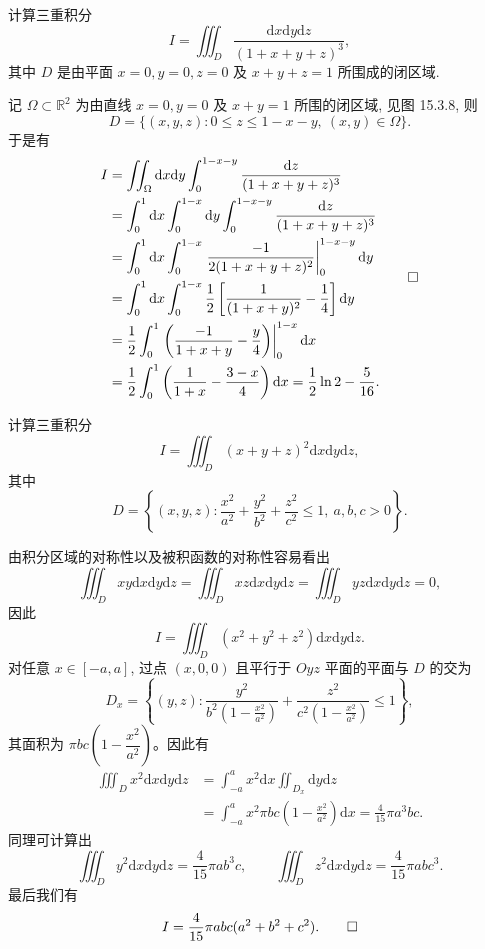 \begin{example}\label{example:ma-15-3-5}
计算三重积分
\[
  I=\iiint_D\frac{\mathrm dx\mathrm dy\mathrm dz}{(1+x+y+z)^3},
\]
其中 $D$ 是由平面 $x=0,y=0,z=0$ 及 $x+y+z=1$ 所围成的闭区域.
\end{example}


\begin{solve}
记 $\Omega\subset\mathbb R^2$ 为由直线 $x=0,y=0$ 及 $x+y=1$ 所围的闭区域, 见图 15.3.8, 则
\[
  D=\{(x,y,z):0\leqslant z\leqslant1-x-y,\ (x,y)\in\Omega\}.
\]
于是有
\[
\begin{aligned}
  I
  &=\iint_\Omega\mathrm dx\mathrm dy\int_0^{1-x-y}\frac{\mathrm dz}{(1+x+y+z)^3}\\
  &=\int_0^1\mathrm dx\int_0^{1-x}\mathrm dy\int_0^{1-x-y}\frac{\mathrm dz}{(1+x+y+z)^3}\\
  &=\int_0^1\mathrm dx\int_0^{1-x}
    \left.\frac{-1}{2(1+x+y+z)^2}\right|_0^{1-x-y}\mathrm dy\\
  &=\int_0^1\mathrm dx\int_0^{1-x}\frac12\left[\frac1{(1+x+y)^2}-\frac14\right]\mathrm dy\\
  &=\frac12\int_0^1\left.\left(\frac{-1}{1+x+y}-\frac y4\right)\right|_0^{1-x}\mathrm dx\\
  &=\frac12\int_0^1\left(\frac1{1+x}-\frac{3-x}{4}\right)\mathrm dx
    =\frac12\ln2-\frac5{16}.
\end{aligned}
\qedhere
\]
\end{solve}


\begin{example}\label{example:ma-15-3-6}
计算三重积分
\[
  I=\iiint_D (x+y+z)^2\mathrm dx\mathrm dy\mathrm dz,
\]
其中
\[
  D=\left\{(x,y,z):\frac{x^2}{a^2}+\frac{y^2}{b^2}+\frac{z^2}{c^2}\leqslant1,\ a,b,c>0\right\}.
\]
\end{example}


\begin{solve}
由积分区域的对称性以及被积函数的对称性容易看出
\[
  \iiint_D xy\mathrm dx\mathrm dy\mathrm dz
  =\iiint_D xz\mathrm dx\mathrm dy\mathrm dz
  =\iiint_D yz\mathrm dx\mathrm dy\mathrm dz=0,
\]
因此
\[
  I=\iiint_D (x^2+y^2+z^2)\mathrm dx\mathrm dy\mathrm dz.
\]
对任意 $x\in[-a,a]$, 过点 $(x,0,0)$ 且平行于 $Oyz$ 平面的平面与 $D$ 的交为
\[
  D_x=\left\{(y,z):\frac{y^2}{b^2\left(1-\frac{x^2}{a^2}\right)}
  +\frac{z^2}{c^2\left(1-\frac{x^2}{a^2}\right)}\leqslant1\right\},
\]
其面积为 $\pi bc\left(1-\dfrac{x^2}{a^2}\right)$。因此有
\[
\begin{aligned}
  \iiint_D x^2\mathrm dx\mathrm dy\mathrm dz
  &=\int_{-a}^a x^2\mathrm dx\iint_{D_x}\mathrm dy\mathrm dz\\
  &=\int_{-a}^a x^2\pi bc\left(1-\frac{x^2}{a^2}\right)\mathrm dx
    =\frac4{15}\pi a^3bc.
\end{aligned}
\]
同理可计算出
\[
  \iiint_D y^2\mathrm dx\mathrm dy\mathrm dz=\frac4{15}\pi ab^3c,\qquad
  \iiint_D z^2\mathrm dx\mathrm dy\mathrm dz=\frac4{15}\pi abc^3.
\]
最后我们有
\[
  I=\frac4{15}\pi abc(a^2+b^2+c^2).
\qedhere
\]
\end{solve}


